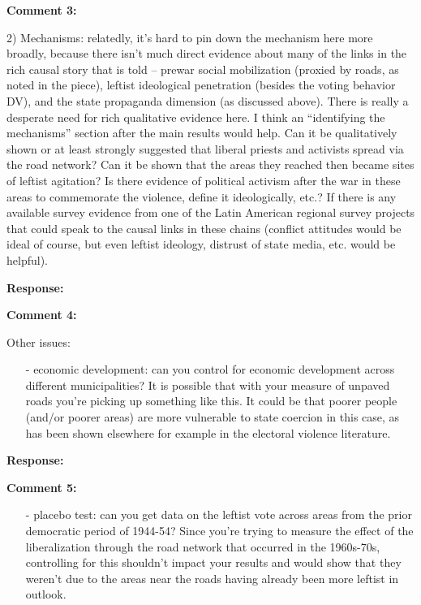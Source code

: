 \documentclass[12pt, a4paper, notitlepage]{article}
\begin{document}
\vspace{15pt}
\noindent\textbf{Comment 3:}
\begin{displayquote}
2) Mechanisms: relatedly, it’s hard to pin down the mechanism here more broadly, because there isn’t much direct evidence about many of the links in the rich causal story that is told – prewar social mobilization (proxied by roads, as noted in the piece), leftist ideological penetration (besides the voting behavior DV), and the state propaganda dimension (as discussed above). There is really a desperate need for rich qualitative evidence here. I think an “identifying the mechanisms” section after the main results would help. Can it be qualitatively shown or at least strongly suggested that liberal priests and activists spread via the road network? Can it be shown that the areas they reached then became sites of leftist agitation? Is there evidence of political activism after the war in these areas to commemorate the violence, define it ideologically, etc.? If there is any available survey evidence from one of the Latin American regional survey projects that could speak to the causal links in these chains (conflict attitudes would be ideal of course, but even leftist ideology, distrust of state media, etc. would be helpful).
\end{displayquote}

\noindent\textbf{Response:}

\vspace{15pt}
\noindent\textbf{Comment 4:}
\begin{displayquote}
Other issues:

\begin{itemize}
\item[-] economic development: can you control for economic development across different municipalities? It is possible that with your measure of unpaved roads you’re picking up something like this. It could be that poorer people (and/or poorer areas) are more vulnerable to state coercion in this case, as has been shown elsewhere for example in the electoral violence literature.
\end{itemize}
\end{displayquote}

\noindent\textbf{Response:}

\vspace{15pt}
\noindent\textbf{Comment 5:}
\begin{displayquote}
\begin{itemize}
\item[-] placebo test: can you get data on the leftist vote across areas from the prior democratic period of 1944-54? Since you’re trying to measure the effect of the liberalization through the road network that occurred in the 1960s-70s, controlling for this shouldn’t impact your results and would show that they weren’t due to the areas near the roads having already been more leftist in outlook.
\end{itemize}
\end{displayquote}
\end{document}
